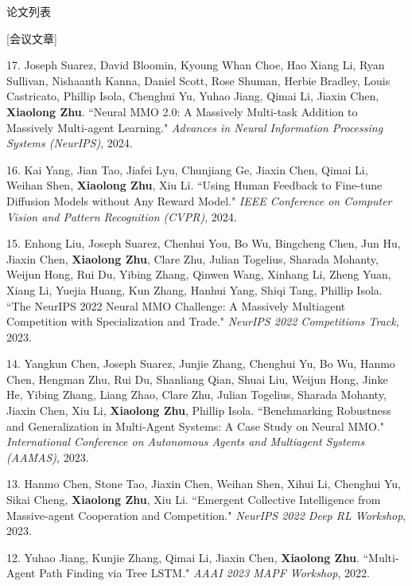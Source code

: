 \documentclass[UTF8]{cv_professional-cn} %
\makeatletter
\newlength{\bibhang}
\newlength{\bibsep}
 {\@listi \global\bibsep\itemsep \global\advance\bibsep by\parsep}
\newenvironment{bibsection}%
        {\vspace{\itemsep}\begin{list}{}{%
       \setlength{\leftmargin}{\bibhang}%
       \setlength{\itemsep}{\bibsep}%
       \setlength{\parsep}{\z@}%
        \setlength{\partopsep}{0pt}%
        \setlength{\topsep}{0pt}}}
        {\end{list}\vspace{\itemsep}}
\makeatother
\begin{document}
\begin{rSection}{论文列表}

[会议文章]

\begin{bibsection}
    \item[17.]Joseph Suarez, David Bloomin, Kyoung Whan Choe, Hao Xiang Li, Ryan Sullivan, Nishaanth Kanna, Daniel Scott, Rose Shuman, Herbie Bradley, Louis Castricato, Phillip Isola, Chenghui Yu, Yuhao Jiang, Qimai Li, Jiaxin Chen, \textbf{Xiaolong Zhu}. ``Neural MMO 2.0: A Massively Multi-task Addition to Massively Multi-agent Learning." \emph{Advances in Neural Information Processing Systems (NeurIPS)}, 2024.

    \item[16.]Kai Yang, Jian Tao, Jiafei Lyu, Chunjiang Ge, Jiaxin Chen, Qimai Li, Weihan Shen, \textbf{Xiaolong Zhu}, Xiu Li. ``Using Human Feedback to Fine-tune Diffusion Models without Any Reward Model." \emph{IEEE Conference on Computer Vision and Pattern Recognition (CVPR)}, 2024.

    \item[15.]Enhong Liu, Joseph Suarez, Chenhui You, Bo Wu, Bingcheng Chen, Jun Hu, Jiaxin Chen, \textbf{Xiaolong Zhu}, Clare Zhu, Julian Togelius, Sharada Mohanty, Weijun Hong, Rui Du, Yibing Zhang, Qinwen Wang, Xinhang Li, Zheng Yuan, Xiang Li, Yuejia Huang, Kun Zhang, Hanhui Yang, Shiqi Tang, Phillip Isola. ``The NeurIPS 2022 Neural MMO Challenge: A Massively Multiagent Competition with Specialization and Trade." \emph{NeurIPS 2022 Competitions Track}, 2023.
  
    \item[14.]Yangkun Chen, Joseph Suarez, Junjie Zhang, Chenghui Yu, Bo Wu, Hanmo Chen, Hengman Zhu, Rui Du, Shanliang Qian, Shuai Liu, Weijun Hong, Jinke He, Yibing Zhang, Liang Zhao, Clare Zhu, Julian Togelius, Sharada Mohanty, Jiaxin Chen, Xiu Li, \textbf{Xiaolong Zhu}, Phillip Isola. ``Benchmarking Robustness and Generalization in Multi-Agent Systems: A Case Study on Neural MMO." \emph{International Conference on Autonomous Agents and Multiagent Systems (AAMAS)}, 2023.

    \item[13.]Hanmo Chen, Stone Tao, Jiaxin Chen, Weihan Shen, Xihui Li, Chenghui Yu, Sikai Cheng, \textbf{Xiaolong Zhu}, Xiu Li. ``Emergent Collective Intelligence from Massive-agent Cooperation and Competition." \emph{NeurIPS 2022 Deep RL Workshop}, 2023.
  
    \item[12.]Yuhao Jiang, Kunjie Zhang, Qimai Li, Jiaxin Chen, \textbf{Xiaolong Zhu}. ``Multi-Agent Path Finding via Tree LSTM." \emph{AAAI 2023 MAPF Workshop}, 2022.
  

\end{bibsection}
\end{rSection}
\end{document}
